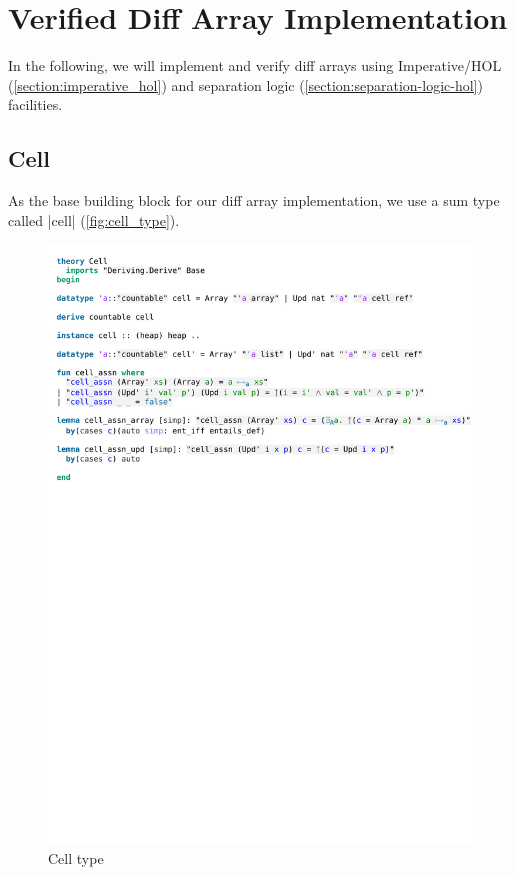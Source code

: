 \chapter{Verified Diff Array Implementation}\label{chapter:diff-array}
 
In the following, we will implement and verify diff arrays using Imperative/HOL (\autoref{section:imperative_hol}) and separation logic (\autoref{section:separation-logic-hol}) facilities.
 
\section{Cell}

As the base building block for our diff array implementation, we use a sum type called |cell| (\autoref{fig:cell_type}).

\begin{figure}[htpb]
    \includegraphics[trim={0 26,7cm 0 2,5cm}, clip, width=1.00\textwidth]{figures/Theory_Cell.pdf}
    \caption[Cell type]{Cell type}
    \label{fig:cell_type}
\end{figure}

